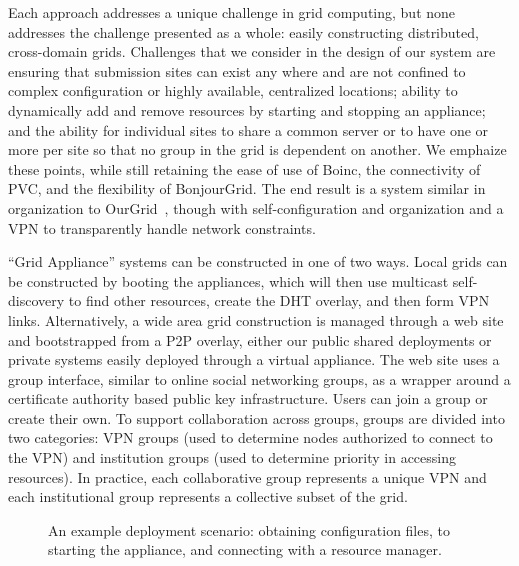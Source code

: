 \documentclass[conference]{IEEEtran}
\begin{document}
Each approach addresses a unique challenge in grid computing, but none
addresses the challenge presented as a whole: easily constructing distributed,
cross-domain grids.  Challenges that we consider in the design of our system
are ensuring that submission sites can exist any where and are not confined to
complex configuration or highly available, centralized locations; ability to
dynamically add and remove resources by starting and stopping an appliance; and
the ability for individual sites to share a common server or to have one or
more per site so that no group in the grid is dependent on another.  We
emphaize these points, while still retaining the ease of use of Boinc, the
connectivity of PVC, and the flexibility of BonjourGrid.  The end result is a
system similar in organization to OurGrid~\cite{ourgrid}, though with
self-configuration and organization and a VPN to transparently handle network
constraints.

``Grid Appliance'' systems can be constructed in one of two ways.  Local grids
can be constructed by booting the appliances, which will then use multicast
self-discovery to find other resources, create the DHT overlay, and then form
VPN links.  Alternatively, a wide area grid construction is managed through a
web site and bootstrapped from a P2P overlay, either our public shared
deployments or private systems easily deployed through a virtual appliance.
The web site uses a group interface, similar to online social networking
groups, as a wrapper around a certificate authority based public key
infrastructure.  Users can join a group or create their own.  To support
collaboration across groups, groups are divided into two categories: VPN groups
(used to determine nodes authorized to connect to the VPN) and institution
groups (used to determine priority in accessing resources).  In practice, each
collaborative group represents a unique VPN and each institutional group
represents a collective subset of the grid.  

\begin{figure}[h]
\centering
{}
\caption{An example deployment scenario:  obtaining configuration files, to
starting the appliance, and connecting with a resource manager.}
\label{fig:system}
\end{figure}
\end{document}
